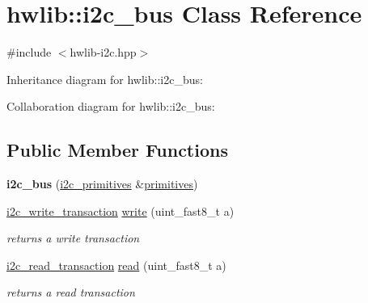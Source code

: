 \hypertarget{classhwlib_1_1i2c__bus}{}\section{hwlib\+:\+:i2c\+\_\+bus Class Reference}
\label{classhwlib_1_1i2c__bus}


{\ttfamily \#include $<$hwlib-\/i2c.\+hpp$>$}



Inheritance diagram for hwlib\+:\+:i2c\+\_\+bus\+:


Collaboration diagram for hwlib\+:\+:i2c\+\_\+bus\+:
\subsection*{Public Member Functions}
\begin{DoxyCompactItemize}
\item 
\mbox{\label{classhwlib_1_1i2c__bus_a997b8940b11b41bcaad065ea992170da}} 
{\bfseries i2c\+\_\+bus} (\hyperlink{classhwlib_1_1i2c__primitives}{i2c\+\_\+primitives} \&\hyperlink{classhwlib_1_1i2c__bus_a676f1d61bce4122a7d446a42f749d567}{primitives})
\item 
\mbox{\label{classhwlib_1_1i2c__bus_ad0b808c4d9b1ed7b16ee13c735c25597}} 
\hyperlink{classhwlib_1_1i2c__write__transaction}{i2c\+\_\+write\+\_\+transaction} \hyperlink{classhwlib_1_1i2c__bus_ad0b808c4d9b1ed7b16ee13c735c25597}{write} (uint\+\_\+fast8\+\_\+t a)
\begin{DoxyCompactList}\small\item\em returns a write transaction \end{DoxyCompactList}\item 
\mbox{\label{classhwlib_1_1i2c__bus_ac4dd659c140ae5f8f7d6bbd48351d88f}} 
\hyperlink{classhwlib_1_1i2c__read__transaction}{i2c\+\_\+read\+\_\+transaction} \hyperlink{classhwlib_1_1i2c__bus_ac4dd659c140ae5f8f7d6bbd48351d88f}{read} (uint\+\_\+fast8\+\_\+t a)
\begin{DoxyCompactList}\small\item\em returns a read transaction \end{DoxyCompactList}\end{DoxyCompactItemize}
